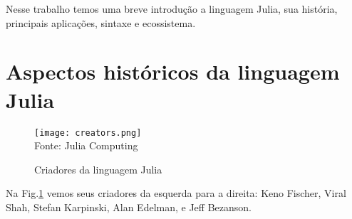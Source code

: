  Nesse trabalho temos uma breve introdução a linguagem Julia, sua história, principais aplicações, sintaxe e ecossistema. 





\newpage
\section{Aspectos históricos da linguagem Julia}

\begin{figure}[H]
   \begin{center}
       \caption{Criadores da linguagem Julia} \label{criadores}
       \texttt{[image: creators.png]} \\
       {\tiny \sf Fonte: Julia Computing}
   \end{center}
  \end{figure}

Na Fig.\ref{criadores} vemos seus criadores da esquerda para a direita: Keno Fischer, Viral Shah, Stefan Karpinski, Alan Edelman, e Jeff Bezanson.
\newline

